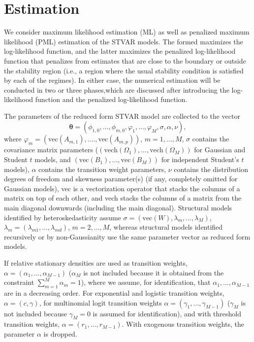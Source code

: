 \documentclass[nojss]{jss}
\begin{document}
\section{Estimation}\label{sec:estimation}
We consider maximum likelihood estimation (ML) as well as penalized maximum likelihood (PML) estimation of the STVAR models. The formed maximizes the log-likelihood function, and the latter maximizes the penalized log-likelihood function that penalizes from estimates that are close to the boundary or outside the stability region (i.e., a region where the usual stability condition is satisfied by each of the regimes). In either case, the numerical estimation will be conducted in two or three phases,which are discussed after introducing the log-likelihood function and the penalized log-likelihood function.

The parameters of the reduced form STVAR model are collected to the vector
\begin{equation}\label{eq:paramvector}
\boldsymbol{\theta}=(\phi_{1,0},...,\phi_{m,0},\varphi_1,...,\varphi_M,\sigma,\alpha,\nu),
\end{equation}
where $\varphi_m=(\text{vec}(A_{m,1}),....,\text{vec}(A_{m,p}))$, $m=1,...,M$, $\sigma$ contains the covariance matrix parameters ($(\text{vech}(\Omega_1),...,\text{vech}(\Omega_M))$ for Gaussian and Student $t$ models, and $(\text{vec}(B_1),...,\text{vec}(B_M))$ for independent Student's $t$ models), $\alpha$ contains the transition weight parameters, $\nu$ contains the distribution degrees of freedom and skewness parameter(s) (if any, completely omitted for Gaussian models), vec is a vectorization operator that stacks the columns of a matrix on top of each other, and vech stacks the columns of a matrix from the main diagonal downwards (including the main diagonal). Structural models identified by heteroskedasticity assume $\sigma = (\text{vec}(W),\lambda_m,...,\lambda_M)$, $\lambda_m=(\lambda_{m1},...,\lambda_{md})$, $m=2,...,M$, whereas structural models identified recursively or by non-Gaussianity use the same parameter vector as reduced form models.

If relative stationary densities are used as transition weights, $\alpha=(\alpha_1,...,\alpha_{M-1})$ ($\alpha_M$ is not included because it is obtained from the constraint $\sum_{m=1}^M \alpha_m=1$), where we assume, for identification, that $\alpha_1,...,\alpha_{M-1}$ are in a decreasing order. For exponential and logistic transition weights, $\alpha=(c,\gamma)$, for multinomial logit transition weights  $\alpha=(\gamma_1,...,\gamma_{M-1})$ ($\gamma_M$ is not included because $\gamma_M=0$ is assumed for identification), and with threshold transition weights, $\alpha=(r_1,...,r_{M-1})$. With exogenous transition weights, the parameter $\alpha$ is dropped.
\end{document}
